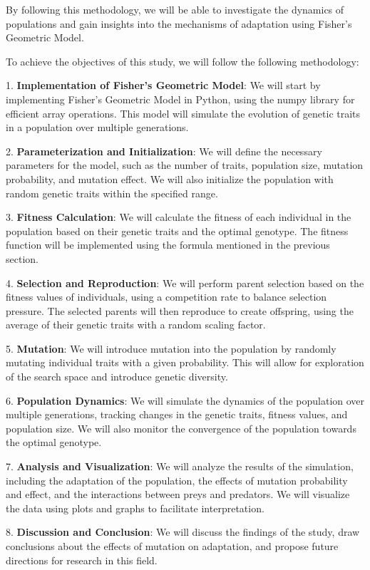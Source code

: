 \documentclass{article}
\begin{document}
By following this methodology, we will be able to investigate the dynamics of populations and gain insights into the mechanisms of adaptation using Fisher's Geometric Model.

To achieve the objectives of this study, we will follow the following methodology:

1. \textbf{Implementation of Fisher's Geometric Model}: We will start by implementing Fisher's Geometric Model in Python, using the numpy library for efficient array operations. This model will simulate the evolution of genetic traits in a population over multiple generations.

2. \textbf{Parameterization and Initialization}: We will define the necessary parameters for the model, such as the number of traits, population size, mutation probability, and mutation effect. We will also initialize the population with random genetic traits within the specified range.

3. \textbf{Fitness Calculation}: We will calculate the fitness of each individual in the population based on their genetic traits and the optimal genotype. The fitness function will be implemented using the formula mentioned in the previous section.

4. \textbf{Selection and Reproduction}: We will perform parent selection based on the fitness values of individuals, using a competition rate to balance selection pressure. The selected parents will then reproduce to create offspring, using the average of their genetic traits with a random scaling factor.

5. \textbf{Mutation}: We will introduce mutation into the population by randomly mutating individual traits with a given probability. This will allow for exploration of the search space and introduce genetic diversity.

6. \textbf{Population Dynamics}: We will simulate the dynamics of the population over multiple generations, tracking changes in the genetic traits, fitness values, and population size. We will also monitor the convergence of the population towards the optimal genotype.

7. \textbf{Analysis and Visualization}: We will analyze the results of the simulation, including the adaptation of the population, the effects of mutation probability and effect, and the interactions between preys and predators. We will visualize the data using plots and graphs to facilitate interpretation.

8. \textbf{Discussion and Conclusion}: We will discuss the findings of the study, draw conclusions about the effects of mutation on adaptation, and propose future directions for research in this field.
\end{document}
